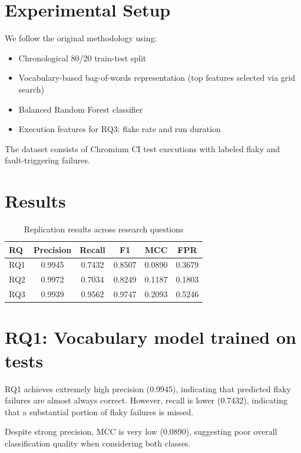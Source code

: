 \documentclass[pdflatex,sn-mathphys-num]{sn-jnl}
\begin{document}
\section{Experimental Setup}

We follow the original methodology using:

\begin{itemize}
\item Chronological 80/20 train-test split
\item Vocabulary-based bag-of-words representation (top features selected via grid search)
\item Balanced Random Forest classifier
\item Execution features for RQ3: flake rate and run duration
\end{itemize}

The dataset consists of Chromium CI test executions with labeled flaky and fault-triggering failures.

\section{Results}

\begin{table}[h]
\centering
\caption{Replication results across research questions}
\begin{tabular}{lccccc}
\toprule
RQ & Precision & Recall & F1 & MCC & FPR \\
\midrule
RQ1 & 0.9945 & 0.7432 & 0.8507 & 0.0890 & 0.3679 \\
RQ2 & 0.9972 & 0.7034 & 0.8249 & 0.1187 & 0.1803 \\
RQ3 & 0.9939 & 0.9562 & 0.9747 & 0.2093 & 0.5246 \\
\bottomrule
\end{tabular}
\end{table}

\section{RQ1: Vocabulary model trained on tests}

RQ1 achieves extremely high precision (0.9945), indicating that predicted flaky failures are almost always correct. However, recall is lower (0.7432), indicating that a substantial portion of flaky failures is missed.

Despite strong precision, MCC is very low (0.0890), suggesting poor overall classification quality when considering both classes.
\end{document}
